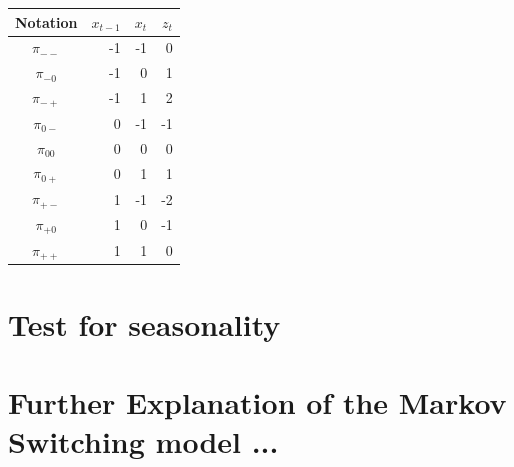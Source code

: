 \documentclass[12pt,a4paper,oneside]{book}
\begin{document}
\begin{center}
\begin{tabular}{|c|r|r|r|}
Notation    &  $x_{t-1}$ & $x_t$ & $z_t$ \\\hline
$\pi_{--}$    &  -1  & -1    & 0 \\
$\pi_{-0}$    &  -1  & 0     & 1 \\
$\pi_{-+}$    &  -1  & 1     & 2 \\
$\pi_{0-}$    &  0   & -1    & -1 \\
$\pi_{00}$    &  0   & 0     & 0 \\
$\pi_{0+}$    &  0   & 1     & 1 \\
$\pi_{+-}$    &  1   & -1    & -2 \\
$\pi_{+0}$    &  1   & 0     & -1 \\
$\pi_{++}$    &  1   & 1     & 0 \\
\end{tabular}  
\end{center}

\newpage

\section*{Test for seasonality}
\label{sec:test for seasonality}

\newpage
\section*{Further Explanation of the Markov Switching model ...}
\end{document}
